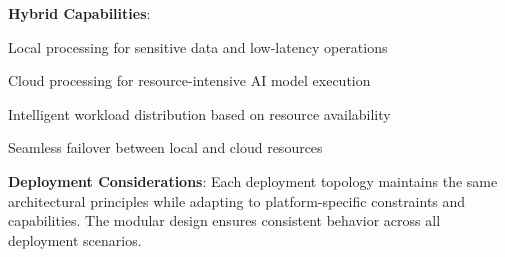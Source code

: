 \textbf{Hybrid Capabilities}:
\begin{compactlist}
    \item Local processing for sensitive data and low-latency operations
    \item Cloud processing for resource-intensive AI model execution
    \item Intelligent workload distribution based on resource availability
    \item Seamless failover between local and cloud resources
\end{compactlist}

\begin{alertbox}
\textbf{Deployment Considerations}: Each deployment topology maintains the same architectural principles while adapting to platform-specific constraints and capabilities. The modular design ensures consistent behavior across all deployment scenarios.
\end{alertbox}